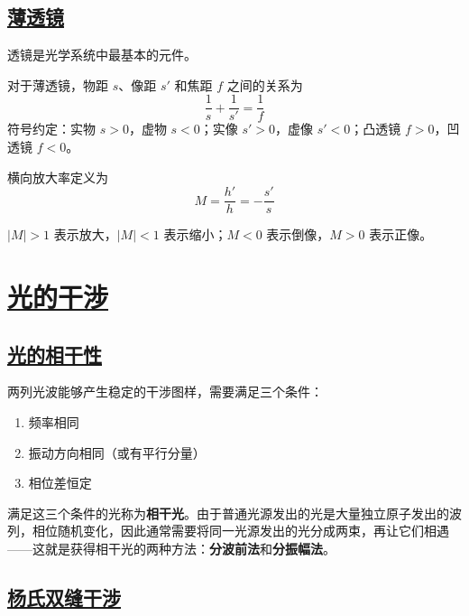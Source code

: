 \subsection{\protect\hyperlink{:}{薄透镜}}

透镜是光学系统中最基本的元件。

\begin{definition}[薄透镜公式]
    对于薄透镜，物距 $s$、像距 $s'$ 和焦距 $f$ 之间的关系为
    \begin{equation}
        \frac{1}{s} + \frac{1}{s'} = \frac{1}{f}
    \end{equation}
    符号约定：实物 $s > 0$，虚物 $s < 0$；实像 $s' > 0$，虚像 $s' < 0$；凸透镜 $f > 0$，凹透镜 $f < 0$。
\end{definition}

横向放大率定义为
\begin{equation}
    M = \frac{h'}{h} = -\frac{s'}{s}
\end{equation}

$|M| > 1$ 表示放大，$|M| < 1$ 表示缩小；$M < 0$ 表示倒像，$M > 0$ 表示正像。


\section{\protect\hyperlink{:}{光的干涉}}

\subsection{\protect\hyperlink{:}{光的相干性}}

两列光波能够产生稳定的干涉图样，需要满足三个条件：
\begin{enumerate}
    \item 频率相同
    \item 振动方向相同（或有平行分量）
    \item 相位差恒定
\end{enumerate}

满足这三个条件的光称为\textbf{相干光}。由于普通光源发出的光是大量独立原子发出的波列，相位随机变化，因此通常需要将同一光源发出的光分成两束，再让它们相遇——这就是获得相干光的两种方法：\textbf{分波前法}和\textbf{分振幅法}。

\subsection{\protect\hyperlink{:}{杨氏双缝干涉}}

